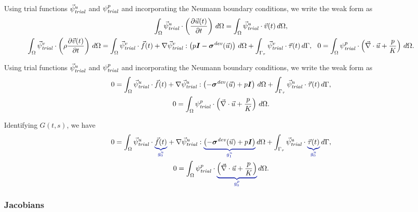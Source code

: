 Using trial functions $\trialvec[u]$ and $\trialscalar[p]$ and
incorporating the Neumann boundary conditions, we write the weak form
as
\begin{gather}
  \int_\Omega \trialvec[u] \cdot \left( \frac{\partial \vec{u}(t)}{\partial t} \right) \, 
d\Omega = 
  \int_\Omega \trialvec[u] \cdot \vec{v}(t) \, d\Omega, \\
  \int_\Omega \trialvec[v] \cdot \left( \rho \frac{\partial \vec{v}(t)}{\partial t} \right) \, 
d\Omega = 
  \int_\Omega \trialvec[v] \cdot \vec{f}(t) + \nabla \trialvec[v] : \left(p\tensor{I}-
\tensor{\sigma}^\mathit{dev}
(\vec{u})\right)\, d\Omega + \int_{\Gamma_\tau} \trialvec[v] \cdot \vec{\tau}(t) \, d\Gamma, \
\
  0 = \int_\Omega \trialscalar[p] \cdot \left(\vec{\nabla} \cdot \vec{u} + \frac{p}{K} \right) 
\, d\Omega.
\end{gather}

Using trial functions $\trialvec[u]$ and $\trialscalar[p]$ and
incorporating the Neumann boundary conditions, we write the weak form
as
\begin{gather}
  0 = 
  \int_\Omega \trialvec[u] \cdot \vec{f}(t) + \nabla \trialvec[u] : \left(-\tensor{\sigma}^\mathit{dev}(\vec{u}) + p\tensor{I}
  \right)\, d\Omega + \int_{\Gamma_\tau} \trialvec[u] \cdot \vec{\tau}(t) \, d\Gamma, \\
  0 = \int_\Omega \trialscalar[p] \cdot \left(\vec{\nabla} \cdot \vec{u} + \frac{p}{K} \right) 
\, d\Omega.
\end{gather}

Identifying $G(t,s)$, we have
\begin{gather}
  \label{eqn:incompressible:elasticity:displacement}
  0 = \int_\Omega \trialvec[u] \cdot \eqnannotate{\vec{f}(t)}{g_0^u} + \nabla \trialvec[u] :
  \eqnannotate{\left(-\tensor{\sigma}^\mathit{dev}(\vec{u}) + p\tensor{I}\right)}{g_1^u}  \, d\Omega
  + \int_{\Gamma_\tau} \trialvec[u] \cdot \eqnannotate{\vec{\tau}(t)}{g_0^u} \, d\Gamma, \\
%
  \label{eqn:incompressible:elasticity:pressure}
  0 = \int_\Omega \trialscalar[p] \cdot \eqnannotate{\left(\vec{\nabla} \cdot \vec{u} + 
\frac{p}{K} \right)}{g_0^p} \, d\Omega.
\end{gather}


\subsubsection{Jacobians}

